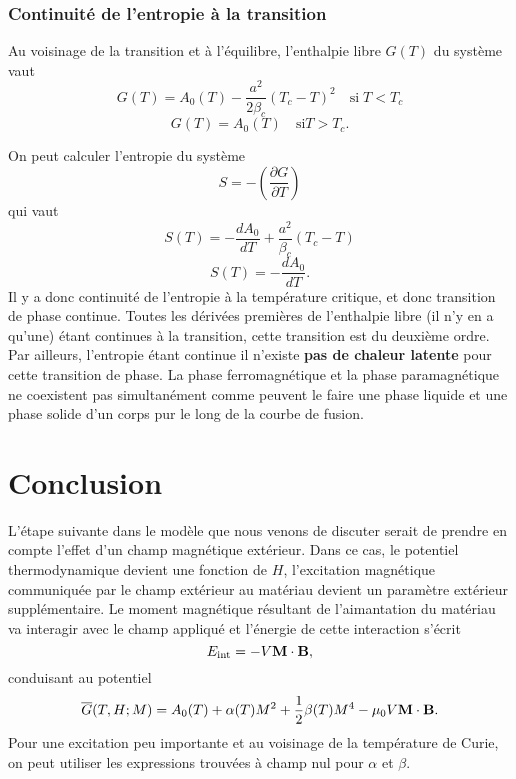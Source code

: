 \documentclass[11pt,a4paper]{report}
\begin{document}
\subsubsection*{Continuité de l'entropie à la transition}

Au voisinage de la transition et à l'équilibre, l'enthalpie libre $G(T)$ du système vaut
	\begin{equation}
		G(T) = A_0(T) - \frac{a^2}{2\beta_c}\left(T_c - T\right)^2\quad\text{si}\; T < T_c
	\end{equation}
	\begin{equation}
		G(T) = A_0(T)\quad\text{si} T > T_c.
	\end{equation}

On peut calculer l'entropie du système
\begin{equation}
	S = -\left(\frac{\partial G}{\partial T}\right)
\end{equation}
qui vaut
\begin{equation}
	S(T) = -\frac{dA_0}{dT} + \frac{a^2}{\beta_c}\left(T_c - T\right)
\end{equation}
\begin{equation}
	S(T) = -\frac{dA_0}{dT}.
\end{equation}
Il y a donc continuité de l'entropie à la température critique, et donc transition de phase continue. Toutes les dérivées premières de l'enthalpie libre (il n'y en a qu'une) étant continues à la transition, cette transition est du deuxième ordre.\\

Par ailleurs, l'entropie étant continue il n'existe \textbf{pas de chaleur latente} pour cette transition de phase. La phase ferromagnétique et la phase paramagnétique ne coexistent pas simultanément comme peuvent le faire une phase liquide et une phase solide d'un corps pur le long de la courbe de fusion.

\newpage
\section*{Conclusion}

L'étape suivante dans le modèle que nous venons de discuter serait de prendre en compte l'effet d'un champ magnétique extérieur. Dans ce cas, le potentiel thermodynamique devient une fonction de $H$, l'excitation magnétique communiquée par le champ extérieur au matériau devient un paramètre extérieur supplémentaire. Le moment magnétique résultant de l'aimantation du matériau va interagir avec le champ appliqué et l'énergie de cette interaction s'écrit
\begin{equation}
	E_\text{int} = -V\bold{M}\cdot\bold{B},
\end{equation}
conduisant au potentiel
\begin{equation}
	\overline{G}(T,H;M) = A_0(T) + \alpha(T) M^2 + \frac{1}{2}\beta(T)M^4 
	- \mu_0 V\bold{M}\cdot\bold{B}.
\end{equation}
Pour une excitation peu importante et au voisinage de la température de Curie, on peut utiliser les expressions trouvées à champ nul pour $\alpha$ et $\beta$.
\end{document}
